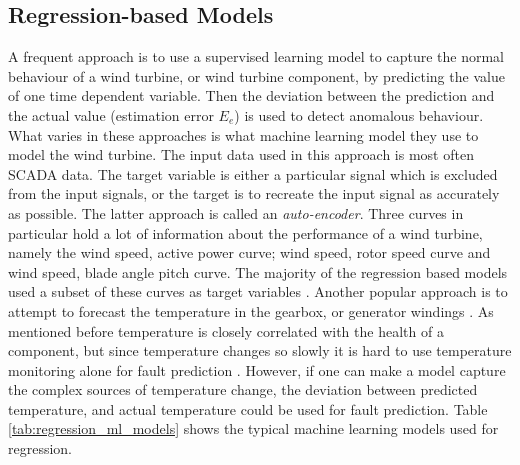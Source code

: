 \subsection{Regression-based Models}
A frequent approach is to use a supervised learning model to capture the normal behaviour of a wind turbine, or wind turbine component, by predicting the value of one time dependent variable. 
Then the deviation between the prediction and the actual value (estimation error $E_e$) is used to detect anomalous behaviour. 
What varies in these approaches is what machine learning model they use to model the wind turbine. 
The input data used in this approach is most often SCADA data. 
The target variable is either a particular signal which is excluded from the input signals, or the target is to recreate the input signal as accurately as possible. 
The latter approach is called an \textit{auto-encoder}. 
Three curves in particular hold a lot of information about the performance of a wind turbine, namely the wind speed, active power curve; wind speed, rotor speed curve and wind speed, blade angle pitch curve. 
The majority of the regression based models used a subset of these curves as target variables \cite{perf_mon_of_wt_using_extreme_func_theory, GP_operational_curve_monitoring, high_freq_scada_perf_monit_sensitivity, abnormal_detection_scada_data_mining, improved_power_curve_monitoring_of_wt, SVR_blade_pitch_curve_cm, health_cond_model_nn_proportional_hazard_models}. 
Another popular approach is to attempt to forecast the temperature in the gearbox, or generator windings \cite{AD_and_fault_analysis_wt_DAE, health_cond_model_nn_proportional_hazard_models, detecting_malfunctions_wt_generator_bearings_generic_vs_specific_models, CBPM_ABPM_maintainance_model, wt_gearbox_bearing_temp_KS_CNN, DBN_chicken_swarm_optim}. 
As mentioned before temperature is closely correlated with the health of a component, but since temperature changes so slowly it is hard to use temperature monitoring alone for fault prediction \cite{wt_cm_rev_new_trends_chal_2014}. 
However, if one can make a model capture the complex sources of temperature change, the deviation between predicted temperature, and actual temperature could be used for fault prediction. 
Table \ref{tab:regression_ml_models} shows the typical machine learning models used for regression. 

